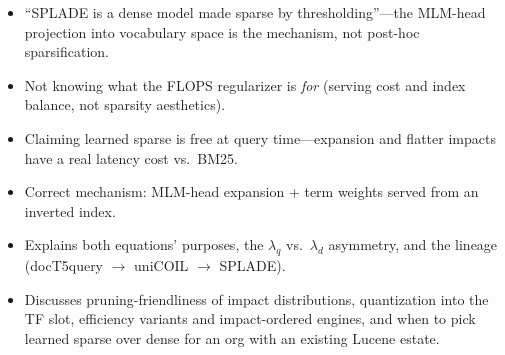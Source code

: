 \begin{interviewq}
\redflags
\begin{itemize}
    \item ``SPLADE is a dense model made sparse by thresholding''---the MLM-head projection into vocabulary space is the mechanism, not post-hoc sparsification.
    \item Not knowing what the FLOPS regularizer is \emph{for} (serving cost and index balance, not sparsity aesthetics).
    \item Claiming learned sparse is free at query time---expansion and flatter impacts have a real latency cost vs.\ BM25.
\end{itemize}


\goodgreat
\begin{itemize}
    \item {} Correct mechanism: MLM-head expansion + term weights served from an inverted index.
    \item {} Explains both equations' purposes, the $\lambda_q$ vs.\ $\lambda_d$ asymmetry, and the lineage (docT5query $\rightarrow$ uniCOIL $\rightarrow$ SPLADE).
    \item {} Discusses pruning-friendliness of impact distributions, quantization into the TF slot, efficiency variants and impact-ordered engines, and when to pick learned sparse over dense for an org with an existing Lucene estate.
\end{itemize}

\end{interviewq}

